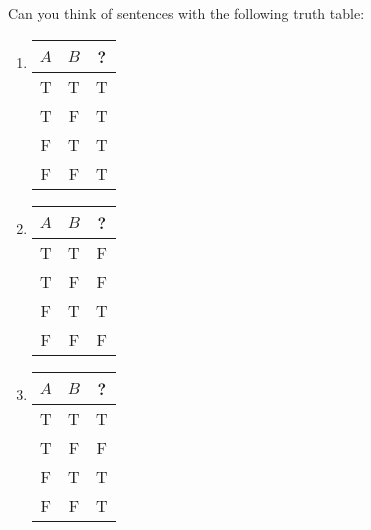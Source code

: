 \begin{practiceproblems}
\begin{earg}
\vspace{1em}


\end{earg}



\problempart
 Can you think of sentences with the following truth table:
\begin{enumerate}
\item \begin{tabular}{cc|c}
$A$&$B$&?\\\hline
T&T&T\\
T&F&T\\
F&T&T\\
F&F&T
\end{tabular}
\item \begin{tabular}{cc|c}
$A$&$B$&?\\\hline
T&T&F\\
T&F&F\\
F&T&T\\
F&F&F
\end{tabular}
\item \begin{tabular}{cc|c}
$A$&$B$&?\\\hline
T&T&T\\
T&F&F\\
F&T&T\\
F&F&T
\end{tabular}


\end{enumerate}
\end{practiceproblems}
